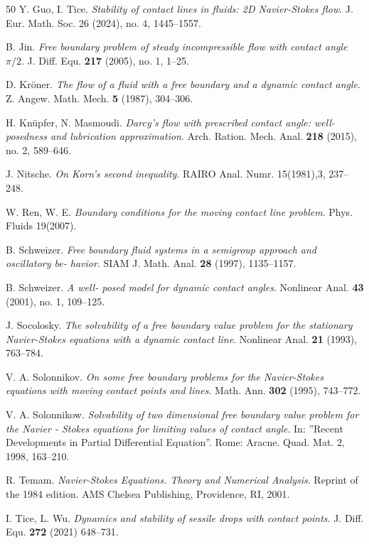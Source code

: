 \documentclass[letterpaper,reqno,10pt,twoside]{amsart}
\theoremstyle{definition}
\theoremstyle{remark}
\begin{document}
\begin{thebibliography}{50}
			 Y. Guo, I. Tice. {\em  Stability of contact lines in fluids: 2D Navier-Stokes flow}. J. Eur. Math. Soc. 26 (2024), no. 4, 1445--1557.
			
			 B. Jin. \emph{ Free boundary problem of steady incompressible flow with contact angle $\pi/2$}. J. Diff. Equ. {\bf 217} (2005), no. 1, 1--25.
			
			 D. Kr\"oner. \emph{ The flow of a fluid with a free boundary and a dynamic contact angle}. Z.
			Angew. Math. Mech. {\bf 5} (1987), 304--306.
			
			 H. Kn\"upfer, N. Masmoudi. \emph{ Darcy's flow with prescribed contact angle: well- posedness and lubrication approximation}. Arch. Ration. Mech. Anal. {\bf 218} (2015), no. 2, 589--646.
			
			 J. Nitsche. {\em On Korn's second inequality}. RAIRO Anal. Numr. 15(1981),3, 237--248.
			
			 W. Ren, W. E. {\em Boundary conditions for the moving contact line problem}. Phys. Fluids 19(2007).
			
			 B. Schweizer. \emph{Free boundary fluid systems in a semigroup approach and oscillatory be-
				havior}. SIAM J. Math. Anal. {\bf 28} (1997), 1135--1157.
			
			 B. Schweizer. {\em A well- posed model for dynamic contact angles}. Nonlinear Anal. {\bf 43} (2001), no. 1, 109--125.
			
			 J. Socolosky. \emph{ The solvability of a free boundary value problem for the stationary
				Navier-Stokes equations with a dynamic contact line}. Nonlinear Anal. {\bf 21} (1993), 763--784.
			
			V. A. Solonnikov. \emph{ On some free boundary problems for the Navier-Stokes equations with
				moving contact points and lines}. Math. Ann. {\bf 302} (1995), 743--772.
			
			 V. A. Solonnikow. \emph{ Solvability of two dimensional free boundary value problem for the
				Navier - Stokes equations for limiting values of contact angle}. In: ''Recent Developments in
			Partial Differential Equation''. Rome: Aracne. Quad. Mat. 2, 1998, 163--210.
			
			 R. Temam. {\em Navier-Stokes Equations. Theory and Numerical Analysis}. Reprint of the 1984 edition. AMS Chelsea Publishing, Providence, RI, 2001.
			
			 I. Tice, L. Wu. \emph{ Dynamics and stability of sessile drops with contact points}.  J. Diff. Equ. {\bf 272} (2021) 648--731.
			

\end{thebibliography}
\end{document}
